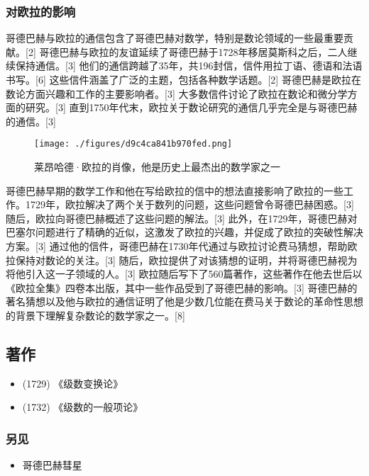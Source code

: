 \subsubsection{对欧拉的影响} 
哥德巴赫与欧拉的通信包含了哥德巴赫对数学，特别是数论领域的一些最重要贡献。[2] 哥德巴赫与欧拉的友谊延续了哥德巴赫于1728年移居莫斯科之后，二人继续保持通信。[3] 他们的通信跨越了35年，共196封信，信件用拉丁语、德语和法语书写。[6] 这些信件涵盖了广泛的主题，包括各种数学话题。[2] 哥德巴赫是欧拉在数论方面兴趣和工作的主要影响者。[3] 大多数信件讨论了欧拉在数论和微分学方面的研究。[3] 直到1750年代末，欧拉关于数论研究的通信几乎完全是与哥德巴赫的通信。[3]
\begin{figure}[ht]
\centering
\texttt{[image: ./figures/d9c4ca841b970fed.png]}
\caption{莱昂哈德·欧拉的肖像，他是历史上最杰出的数学家之一} \label{fig_Goldba_3}
\end{figure}
哥德巴赫早期的数学工作和他在写给欧拉的信中的想法直接影响了欧拉的一些工作。1729年，欧拉解决了两个关于数列的问题，这些问题曾令哥德巴赫困惑。[3] 随后，欧拉向哥德巴赫概述了这些问题的解法。[3] 此外，在1729年，哥德巴赫对巴塞尔问题进行了精确的近似，这激发了欧拉的兴趣，并促成了欧拉的突破性解决方案。[3] 通过他的信件，哥德巴赫在1730年代通过与欧拉讨论费马猜想，帮助欧拉保持对数论的关注。[3] 随后，欧拉提供了对该猜想的证明，并将哥德巴赫视为将他引入这一子领域的人。[3] 欧拉随后写下了560篇著作，这些著作在他去世后以《欧拉全集》四卷本出版，其中一些作品受到了哥德巴赫的影响。[3] 哥德巴赫的著名猜想以及他与欧拉的通信证明了他是少数几位能在费马关于数论的革命性思想的背景下理解复杂数论的数学家之一。[8]
\subsection{著作}  
\begin{itemize}
\item (1729) 《级数变换论》  
\item (1732) 《级数的一般项论》
\end{itemize}
\subsubsection{另见}  
\begin{itemize}
\item 哥德巴赫彗星
\end{itemize}